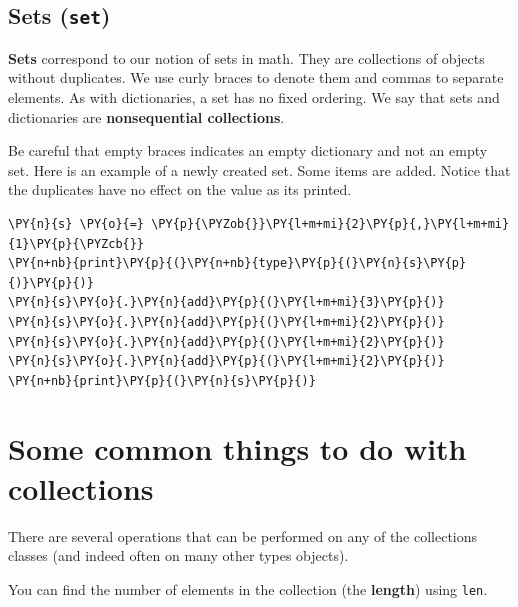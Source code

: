 \subsection{Sets (\texttt{set})}


\textbf{Sets} correspond to our notion of sets in math.  They are collections of objects without duplicates.  We use curly braces to denote them and commas to separate elements.  As with dictionaries, a set has no fixed ordering.  We say that sets and dictionaries are \textbf{nonsequential collections}.


Be careful that empty braces \texttt{{}} indicates an empty dictionary and not an empty set.  Here is an example of a newly created set.  Some items are added.  Notice that the duplicates have no effect on the value as its printed.

\begin{Verbatim}[commandchars=\\\{\}]
\PY{n}{s} \PY{o}{=} \PY{p}{\PYZob{}}\PY{l+m+mi}{2}\PY{p}{,}\PY{l+m+mi}{1}\PY{p}{\PYZcb{}}
\PY{n+nb}{print}\PY{p}{(}\PY{n+nb}{type}\PY{p}{(}\PY{n}{s}\PY{p}{)}\PY{p}{)}
\PY{n}{s}\PY{o}{.}\PY{n}{add}\PY{p}{(}\PY{l+m+mi}{3}\PY{p}{)}
\PY{n}{s}\PY{o}{.}\PY{n}{add}\PY{p}{(}\PY{l+m+mi}{2}\PY{p}{)}
\PY{n}{s}\PY{o}{.}\PY{n}{add}\PY{p}{(}\PY{l+m+mi}{2}\PY{p}{)}
\PY{n}{s}\PY{o}{.}\PY{n}{add}\PY{p}{(}\PY{l+m+mi}{2}\PY{p}{)}
\PY{n+nb}{print}\PY{p}{(}\PY{n}{s}\PY{p}{)}
\end{Verbatim}


\section{Some common things to do with collections}


There are several operations that can be performed on any of the collections classes (and indeed often on many other types objects).


You can find the number of elements in the collection (the \textbf{length}) using \texttt{len}.

